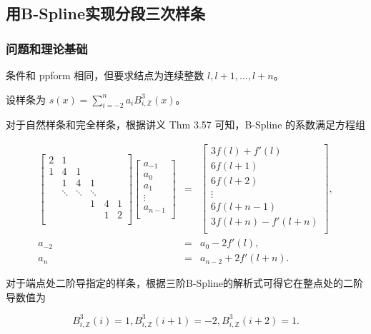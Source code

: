 \documentclass{ctexart}
\begin{document}
\subsection{用B-Spline实现分段三次样条}

\subsubsection{问题和理论基础}
条件和 ppform 相同，但要求结点为连续整数 $l,l+1,\dots,l+n$。

设样条为 $s(x)=\sum_{i=-2}^na_iB_{i,\mathbb{Z}}^3(x)$。

对于自然样条和完全样条，根据讲义 Thm 3.57 可知，B-Spline 的系数满足方程组

\begin{equation}
\begin{aligned}
\begin{bmatrix}
2 & 1 & & & & \\
1 & 4 & 1 & & & \\
& 1 & 4 & 1 & \\
& \ddots & \ddots & \ddots & \\
& & & 1 & 4 & 1 \\
& & & & 1 & 2\\
\end{bmatrix}
\begin{bmatrix}
a_{-1}\\
a_0\\
a_1\\
\vdots\\
a_{n-1}\\
\end{bmatrix}
&=&
\begin{bmatrix}
3f(l)+f'(l)\\
6f(l+1)\\
6f(l+2)\\
\vdots\\
6f(l+n-1)\\
3f(l+n)-f'(l+n)\\
\end{bmatrix},\\
a_{-2}&=&a_0-2f'(l),\\
a_n&=&a_{n-2}+2f'(l+n).
\end{aligned}
\end{equation}

对于端点处二阶导指定的样条，根据三阶B-Spline的解析式可得它在整点处的二阶导数值为

\begin{equation}
B_{i,\mathbb{Z}}^3(i)=1,B_{i,\mathbb{Z}}^3(i+1)=-2,B_{i,\mathbb{Z}}^3(i+2)=1.
\end{equation}
\end{document}
